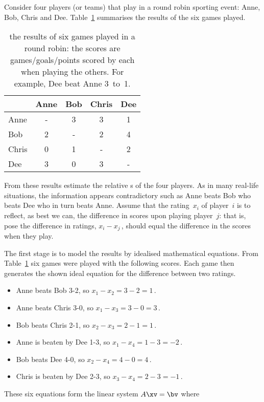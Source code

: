 \begin{example} \label{eg:roundrobin1}
Consider four players (or teams) that play in a round robin sporting event: Anne, Bob, Chris and Dee.
Table~\ref{tbl:roundrobin1} summarises the results of the six games played.
\begin{table}
\caption{the results of six games played in a round robin: the scores are games\slash goals\slash points scored by each when playing the others.  For example, Dee beat Anne 3~to~1.}
\label{tbl:roundrobin1}
\begin{center}
\begin{tabular}{l|cccc} \hline
&Anne& Bob& Chris& Dee\\ \hline
Anne & - & 3 & 3 & 1 \\
Bob & 2 & - & 2 & 4 \\
Chris & 0 & 1 & - & 2 \\
Dee & 3 & 0 & 3 & - \\ \hline
\end{tabular}
\end{center}
\end{table}%
From these results estimate the relative s of the four players.
As in many real-life situations, the information appears contradictory such as Anne beats Bob who beats Dee who in turn beats Anne.
Assume that the rating~\(x_i\) of player~\(i\) is to reflect, as best we can, the difference in scores upon playing player~\(j\):  that is, pose the difference in ratings, \(x_i-x_j\)\,, should equal the difference in the scores when they play.
\begin{solution} 
The first stage is to model the results by idealised mathematical equations.
From Table~\ref{tbl:roundrobin1} six games were played with the following scores.  
Each game then generates the shown ideal equation for the difference between two ratings.
\begin{itemize}
\item Anne beats Bob 3-2, so \(x_1-x_2=3-2=1\)\,.
\item Anne beats Chris 3-0, so \(x_1-x_3=3-0=3\)\,.
\item Bob beats Chris 2-1, so \(x_2-x_3=2-1=1\)\,.
\item Anne is beaten by Dee 1-3, so \(x_1-x_4=1-3=-2\)\,.
\item Bob beats Dee 4-0, so \(x_2-x_4=4-0=4\)\,.
\item Chris is beaten by Dee 2-3, so \(x_3-x_4=2-3=-1\)\,.
\end{itemize}
These six equations form the linear system \(A\xv=\bv\) where

\end{solution}
\end{example}
